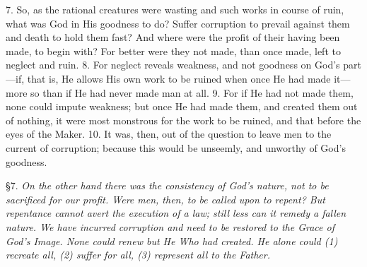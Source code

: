 7. So, as the rational creatures were wasting and such works in course of ruin, what was God in His goodness to do? Suffer corruption to prevail against them and death to hold them fast? And where were the profit of their having been made, to begin with? For better were they not made, than once made, left to neglect and ruin. 8. For neglect reveals weakness, and not goodness on God’s part—if, that is, He allows His own work to be ruined when once He had made it—more so than if He had never made man at all. 9. For if He had not made them, none could impute weakness; but once He had made them, and created them out of nothing, it were most monstrous for the work to be ruined, and that before the eyes of the Maker. 10. It was, then, out of the question to leave men to the current of corruption; because this would be unseemly, and unworthy of God’s goodness.


§7. \emph{On the other hand there was the consistency of God’s nature, not to be sacrificed for our profit. Were men, then, to be called upon to repent? But repentance cannot avert the execution of a law; still less can it remedy a fallen nature. We have incurred corruption and need to be restored to the Grace of God’s Image. None could renew but He Who had created. He alone could (1) recreate all, (2) suffer for all, (3) represent all to the Father.}

